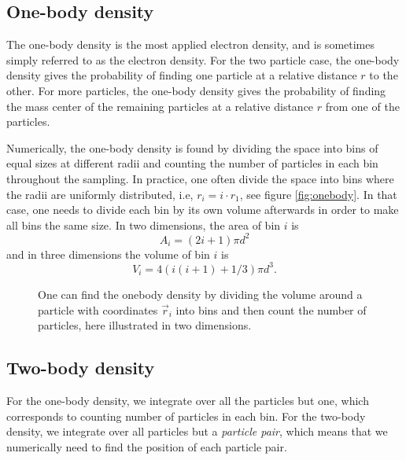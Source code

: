 \subsection{One-body density}
The one-body density is the most applied electron density, and is sometimes simply referred to as the electron density. For the two particle case, the one-body density gives the probability of finding one particle at a relative distance $r$ to the other. For more particles, the one-body density gives the probability of finding the mass center of the remaining particles at a relative distance $r$ from one of the particles.

Numerically, the one-body density is found by dividing the space into bins of equal sizes at different radii and counting the number of particles in each bin throughout the sampling. In practice, one often divide the space into bins where the radii are uniformly distributed, i.e, $r_i=i\cdot r_1$, see figure \eqref{fig:onebody}. In that case, one needs to divide each bin by its own volume afterwards in order to make all bins the same size. In two dimensions, the area of bin $i$ is
\begin{equation}
A_i=(2i+1)\pi d^2
\end{equation}
and in three dimensions the volume of bin $i$ is
\begin{equation}
V_i=4(i(i+1)+1/3)\pi d^3.
\end{equation}

\begin{figure}
	\centering
	\label{fig:onebody}
	
	\caption{One can find the onebody density by dividing the volume around a particle with coordinates $\vec{r}_i$ into bins and then count the number of particles, here illustrated in two dimensions.}
\end{figure}

\subsection{Two-body density}
For the one-body density, we integrate over all the particles but one, which corresponds to counting number of particles in each bin. For the two-body density, we integrate over all particles but a \textit{particle pair}, which means that we numerically need to find the position of each particle pair. 



